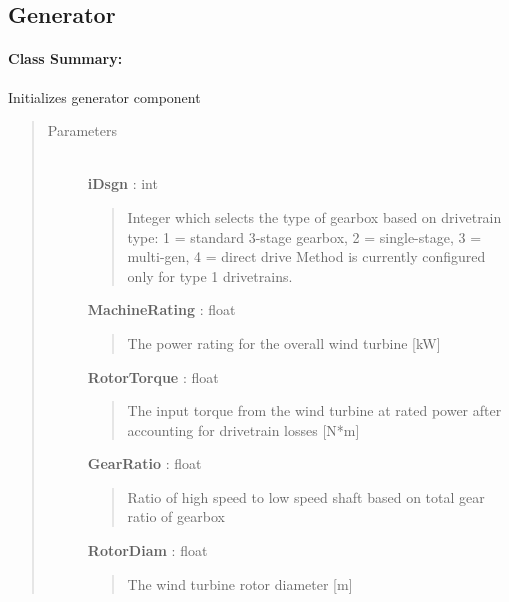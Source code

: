 \documentclass[letterpaper,10pt,openany,oneside]{sphinxmanual}
\begin{document}
\subsection{Generator}
\label{documentation:generator-class-label}\label{documentation:generator}\paragraph{Class Summary:}

\begin{fulllineitems}
\label{documentation:nacelleSE.src.nacelle_components.Generator}
Initializes generator component
\begin{quote}\begin{description}
\item[{Parameters }] \leavevmode\\
\textbf{iDsgn} : int
\begin{quote}

Integer which selects the type of gearbox based on drivetrain type: 1 = standard 3-stage gearbox, 2 = single-stage, 3 = multi-gen, 4 = direct drive
Method is currently configured only for type 1 drivetrains.
\end{quote}

\textbf{MachineRating} : float
\begin{quote}

The power rating for the overall wind turbine {[}kW{]}
\end{quote}

\textbf{RotorTorque} : float
\begin{quote}

The input torque from the wind turbine at rated power after accounting for drivetrain losses {[}N*m{]}
\end{quote}

\textbf{GearRatio} : float
\begin{quote}

Ratio of high speed to low speed shaft based on total gear ratio of gearbox
\end{quote}

\textbf{RotorDiam} : float
\begin{quote}

The wind turbine rotor diameter {[}m{]}
\end{quote}


\end{description}
\end{quote}
\end{fulllineitems}
\end{document}
